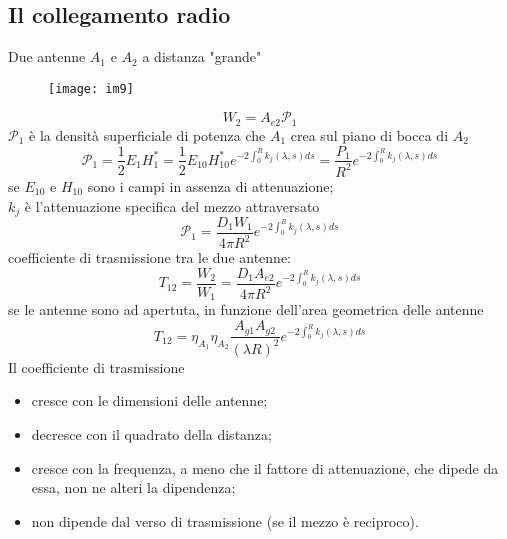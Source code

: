 \documentclass[a4paper]{article}
\begin{document}
\subsection*{Il collegamento radio}
Due antenne $A_1$ e $A_2$ a distanza "grande"
\begin{figure}[ht] 
\centering
\texttt{[image: im9]}
\end{figure}
\begin{equation*}
W_2=A_{e2}\mathcal{P}_1
\end{equation*}
$\mathcal{P}_1$ è la densità superficiale di potenza che $A_1$ crea sul piano di bocca di $A_2$
\begin{equation*}
\mathcal{P}_1=\frac{1}{2}E_1H_1^*=\frac{1}{2}E_{10}H_{10}^*e^{-2\int_0^Rk_j(\lambda,s)ds}=\frac{P_1}{R^2}e^{-2\int_0^Rk_j(\lambda,s)ds}
\end{equation*}
se $E_{10}$ e $H_{10}$ sono i campi in assenza di attenuazione;\\
$k_j$ è l'attenuazione specifica del mezzo attraversato
\begin{equation*}
\mathcal{P}_1=\frac{D_1W_1}{4\pi R^2}e^{-2\int_0^Rk_j(\lambda,s)ds}
\end{equation*}
coefficiente di trasmissione tra le due antenne:
\begin{equation*}
T_{12}=\frac{W_2}{W_1}=\frac{D_1A_{e2}}{4\pi R^2}e^{-2\int_0^Rk_j(\lambda,s)ds}
\end{equation*}
se le antenne sono ad apertuta, in funzione dell'area geometrica delle antenne
\begin{equation*}
T_{12}=\eta_{A_1}\eta_{A_2}\frac{A_{g1}A_{g2}}{(\lambda R)^2}e^{-2\int_0^Rk_j(\lambda,s)ds}
\end{equation*}
Il coefficiente di trasmissione
\begin{itemize}
\item cresce con le dimensioni delle antenne;
\item decresce con il quadrato della distanza;
\item cresce con la frequenza, a meno che il fattore di attenuazione, che dipede da essa, non ne alteri la dipendenza;
\item non dipende dal verso di trasmissione (se il mezzo è reciproco). 
\end{itemize}
\end{document}
